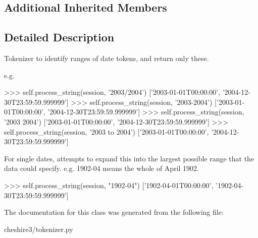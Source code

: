 \subsection*{Additional Inherited Members}


\subsection{Detailed Description}
\begin{DoxyVerb}Tokenizer to identify ranges of date tokens, and return only these.

e.g.

>>> self.process_string(session, '2003/2004')
['2003-01-01T00:00:00', '2004-12-30T23:59:59.999999']
>>> self.process_string(session, '2003-2004')
['2003-01-01T00:00:00', '2004-12-30T23:59:59.999999']
>>> self.process_string(session, '2003 2004')
['2003-01-01T00:00:00', '2004-12-30T23:59:59.999999']
>>> self.process_string(session, '2003 to 2004')
['2003-01-01T00:00:00', '2004-12-30T23:59:59.999999']

For single dates, attempts to expand this into the largest possible range 
that the data could specify. e.g. 1902-04 means the whole of April 1902.

>>> self.process_string(session, "1902-04")
['1902-04-01T00:00:00', '1902-04-30T23:59:59.999999']\end{DoxyVerb}
 

The documentation for this class was generated from the following file\-:\begin{DoxyCompactItemize}
\item 
cheshire3/tokenizer.\-py\end{DoxyCompactItemize}
